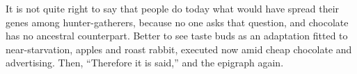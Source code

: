 It is not quite right to say that people do today what would have spread their genes among hunter-gatherers, because no one asks that question, and chocolate has no ancestral counterpart. Better to see taste buds as an adaptation fitted to near-starvation, apples and roast rabbit, executed now amid cheap chocolate and advertising. Then, ``Therefore it is said,'' and the epigraph again.
